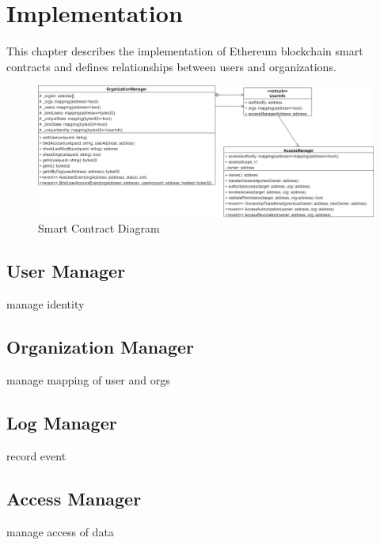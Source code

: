 \chapter{Implementation} 
\label{chapter:implementation}
This chapter describes the implementation of Ethereum blockchain smart contracts and defines relationships between users and organizations.
\begin{figure}[hb]
    \centering
    \includegraphics[height=!,width=1\linewidth,keepaspectratio=true]{figures/smart_contract_diagram.png}
    \caption{{\footnotesize Smart Contract Diagram}}
    \label{fig:smart_contract_diagram}
\end{figure}

\section{User Manager}
manage identity
\section{Organization Manager}
manage mapping of user and orgs
\section{Log Manager}
record event
\section{Access Manager}
manage access of data
